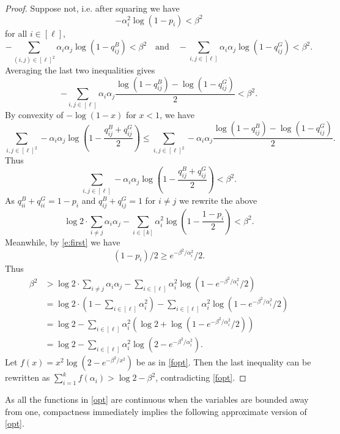 \documentclass{article}
\newcommand{\s}[1]{\left(#1\right)}
\begin{document}
\begin{proof} Suppose not, i.e. after squaring we have
\begin{equation}\label{e:first} -\alpha^2_i \log\s{1-p_i} < \beta^2 \end{equation}  for all $i \in [\ell]$,
$$-\sum_{(i,j)\in [\ell]^2} \alpha_i\alpha_j\log\s{1-q^B_{ij}}< \beta^2 \quad \mathrm{and} \quad
-\sum_{i,j \in [\ell]} \alpha_i\alpha_j\log\s{1-q^G_{ij}} < \beta^2. $$
Averaging the last two inequalities gives
$$- \sum_{i,j \in [\ell]} \alpha_i \alpha_j \frac{\log\s{1 - q_{ij}^B} - \log\s{1-q_{ij}^G}}2 < \beta^2.$$
By convexity of  $-\log\s{1-x}$ for $x < 1$, we have $$\sum_{i,j \in [\ell]^2} - \alpha_i \alpha_j \log\s{1 - \frac{q_{ij}^B + q_{ij}^G}2} \leq \sum_{i,j \in [\ell]^2} - \alpha_i \alpha_j \frac{\log\s{1 - q_{ij}^B} - \log\s{1-q_{ij}^G}}2.$$ Thus $$\sum_{i,j \in [\ell]} - \alpha_i \alpha_j \log\s{1 - \frac{q_{ij}^B + q_{ij}^G}2} < \beta^2.$$ As $q_{ii}^B + q_{ii}^G = 1 - p_i$ and $q_{ij}^B + q_{ij}^G = 1$ for $ i \neq j$ we rewrite the above $$\log 2 \cdot \sum_{i \neq j} \alpha_i \alpha_j - \sum_{i \in [k]} \alpha_i^2 \log\s{1 - \frac{1 - p_i}2} < \beta^2.$$ Meanwhile, by \eqref{e:first} we have
$$ (1 - p_i)/2 \geq e^{-\beta^2/\alpha_i^2}/2.$$
Thus
\begin{align*} \beta^2 &> \log2 \cdot \sum_{i \neq j} \alpha_i \alpha_j - \sum_{i \in [\ell]} \alpha_i^2 \log\s{1 - e^{-\beta^2/\alpha_i^2}/2} \\
&=\log 2\cdot\s{1 -\sum_{i \in [\ell]} \alpha_i^2} - \sum_{i \in [\ell]} \alpha_i^2 \log\s{1 - e^{-\beta^2/\alpha_i^2}/2} \\ &
=\log 2 - \sum_{i \in [\ell]} \alpha_i^2 \s{\log2 +\log\s{1 - e^{-\beta^2/\alpha_i^2}/2}} \\ &=
\log 2 - \sum_{i \in [\ell]} \alpha_i^2 \log\s{2 - e^{-\beta^2/\alpha_i^2}}.\end{align*}
Let
$f(x) = x^2 \log\s{2 - e^{-\beta^2/x^2}}$ be as in \cref{fopt}. Then the last inequality can be rewritten as $\sum_{i=1}^k f(\alpha_i) > \log 2 - \beta^2$, contradicting \cref{fopt}.
\end{proof}

As all the functions in \cref{opt} are continuous when the variables are bounded away from one, compactness immediately implies the following approximate version of \cref{opt}. 
\end{document}
